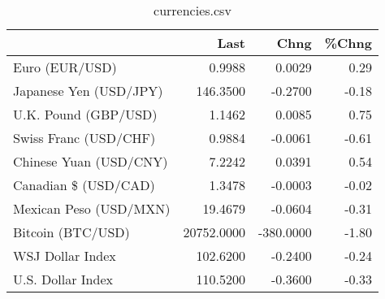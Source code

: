 \documentclass{article}%
\begin{document}
%


\begin{table}[htbp]%
\caption{currencies.csv}%
\centering%
\begin{adjustbox}{width=1\textwidth}%
\begin{tabular}{lrrr}
\toprule
                       &       Last &      Chng &  \%Chng \\
\midrule
        Euro (EUR/USD) &     0.9988 &    0.0029 &   0.29 \\
Japanese Yen (USD/JPY) &   146.3500 &   -0.2700 &  -0.18 \\
  U.K. Pound (GBP/USD) &     1.1462 &    0.0085 &   0.75 \\
 Swiss Franc (USD/CHF) &     0.9884 &   -0.0061 &  -0.61 \\
Chinese Yuan (USD/CNY) &     7.2242 &    0.0391 &   0.54 \\
  Canadian \$ (USD/CAD) &     1.3478 &   -0.0003 &  -0.02 \\
Mexican Peso (USD/MXN) &    19.4679 &   -0.0604 &  -0.31 \\
     Bitcoin (BTC/USD) & 20752.0000 & -380.0000 &  -1.80 \\
      WSJ Dollar Index &   102.6200 &   -0.2400 &  -0.24 \\
     U.S. Dollar Index &   110.5200 &   -0.3600 &  -0.33 \\
\bottomrule
\end{tabular}
%
\end{adjustbox}%
\end{table}

%
\end{document}
